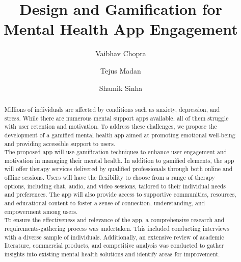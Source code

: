 \documentclass[manuscript,screen,review]{acmart}
\begin{document}
\title{Design and Gamification for Mental Health App Engagement}


\author{Vaibhav Chopra}

 
\author{Tejus Madan}


\author{Shamik Sinha}


\renewcommand{\shortauthors}{Trovato and Tobin, et al.}

\begin{abstract}
Millions of individuals are affected by conditions such as anxiety, depression, and stress. While there are numerous mental support apps available, all of them struggle with user retention and motivation. To address these challenges, we propose the development of a gamified mental health app aimed at promoting emotional well-being and providing accessible support to users.
\\
The proposed app will use gamification techniques to enhance user engagement and motivation in managing their mental health. In addition to gamified elements, the app will offer therapy services delivered by qualified professionals through both online and offline sessions. Users will have the flexibility to choose from a range of therapy options, including chat, audio, and video sessions, tailored to their individual needs and preferences. The app will also provide access to supportive communities, resources, and educational content to foster a sense of connection, understanding, and empowerment among users.
\\
To ensure the effectiveness and relevance of the app, a comprehensive research and requirements-gathering process was undertaken. This included conducting interviews with a diverse sample of individuals. Additionally, an extensive review of academic literature, commercial products, and competitive analysis was conducted to gather insights into existing mental health solutions and identify areas for improvement.

\end{abstract}
\end{document}
